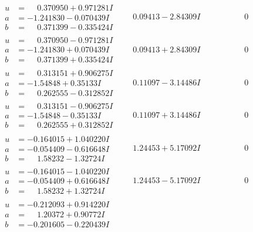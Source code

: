 \documentclass[1p]{elsarticle_modified}
\theoremstyle{definition}
\begin{document}
$$\begin{array}{c|c|c}
\begin{aligned}
u &= \phantom{-}0.370950 + 0.971281 I \\
a &= -1.241830 - 0.070439 I \\
b &= \phantom{-}0.371399 - 0.335424 I\end{aligned}
 & \phantom{-}0.09413 - 2.84309 I & \phantom{-0.000000 } 0 \\ \hline\begin{aligned}
u &= \phantom{-}0.370950 - 0.971281 I \\
a &= -1.241830 + 0.070439 I \\
b &= \phantom{-}0.371399 + 0.335424 I\end{aligned}
 & \phantom{-}0.09413 + 2.84309 I & \phantom{-0.000000 } 0 \\ \hline\begin{aligned}
u &= \phantom{-}0.313151 + 0.906275 I \\
a &= -1.54848 + 0.35133 I \\
b &= \phantom{-}0.262555 - 0.312852 I\end{aligned}
 & \phantom{-}0.11097 - 3.14486 I & \phantom{-0.000000 } 0 \\ \hline\begin{aligned}
u &= \phantom{-}0.313151 - 0.906275 I \\
a &= -1.54848 - 0.35133 I \\
b &= \phantom{-}0.262555 + 0.312852 I\end{aligned}
 & \phantom{-}0.11097 + 3.14486 I & \phantom{-0.000000 } 0 \\ \hline\begin{aligned}
u &= -0.164015 + 1.040220 I \\
a &= -0.054409 - 0.616648 I \\
b &= \phantom{-}1.58232 - 1.32724 I\end{aligned}
 & \phantom{-}1.24453 + 5.17092 I & \phantom{-0.000000 } 0 \\ \hline\begin{aligned}
u &= -0.164015 - 1.040220 I \\
a &= -0.054409 + 0.616648 I \\
b &= \phantom{-}1.58232 + 1.32724 I\end{aligned}
 & \phantom{-}1.24453 - 5.17092 I & \phantom{-0.000000 } 0 \\ \hline\begin{aligned}
u &= -0.212093 + 0.914220 I \\
a &= \phantom{-}1.20372 + 0.90772 I \\
b &= -0.201605 - 0.220439 I\end{aligned}

\end{array}$$
\end{document}
